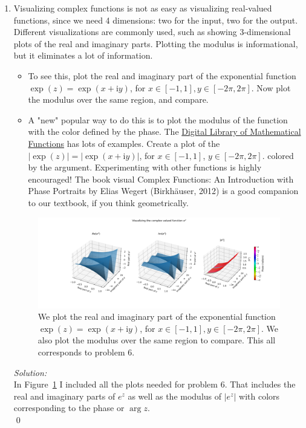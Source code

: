 \documentclass[10pt]{amsart}
\newcommand{\I}{\mathrm{i}}
\theoremstyle{nonumberplain}
\begin{document}
\begin{enumerate}[label={\bf {\arabic*}:}]
\item Visualizing complex functions is not as easy as visualizing
  real-valued functions, since we need 4 dimensions: two for the input,
  two for the output. Different visualizations are commonly used, such
  as showing 3-dimensional plots of the real and imaginary
  parts. Plotting the modulus is informational, but it eliminates a
  lot of information.
  \begin{itemize}
\item To see this, plot the real and imaginary part of the exponential function $\exp (z)=\exp (x+\I y)$, for $x \in[-1,1], y \in[-2 \pi, 2 \pi]$. Now plot the modulus over the same region, and compare.
\item A "new" popular way to do this is to plot the modulus of the
function with the color defined by the phase. The \href{https://dlmf.nist.gov/}{Digital Library of
Mathematical Functions} has lots of examples. Create a plot of the
$|\exp (z)|=|\exp (x+\I y)|$, for $x \in[-1,1]$, $y \in[-2 \pi, 2
\pi]$. colored by the argument. Experimenting with other functions is
highly encouraged! The book visual Complex Functions: An Introduction
with Phase Portraits by Elias Wegert (Birkhäuser, 2012) is a good
companion to our textbook, if you think geometrically.
\end{itemize}
\begin{figure}[h]
	\centering
	\includegraphics[width=1\textwidth]{exp_z_vis.png}
 	\caption{
		We plot the real and imaginary part of the exponential function $\exp (z)=\exp (x+\I y)$, for $x \in[-1,1], y \in[-2 \pi, 2 \pi]$.
		We also plot the modulus over the same region to compare.
		This all corresponds to problem 6.
	}\label{fig:f2}
\end{figure}
\textit{Solution:} \\
In Figure~\ref{fig:f2} I included all the plots needed for problem 6.
That includes the real and imaginary parts of $e^z$ as well as the modulus of $|e^z|$ with colors corresponding to the phase or $\arg z$. \\
\qed


\end{enumerate}
\end{document}
